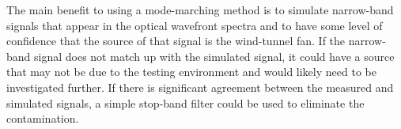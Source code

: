 The main benefit to using a mode-marching method is to simulate narrow-band signals that appear in the optical wavefront spectra and to have some level of confidence that the source of that signal is the wind-tunnel fan.
If the narrow-band signal does not match up with the simulated signal, it could have a source that may not be due to the testing environment and would likely need to be investigated further.
If there is significant agreement between the measured and simulated signals, a simple stop-band filter could be used to eliminate the contamination.
